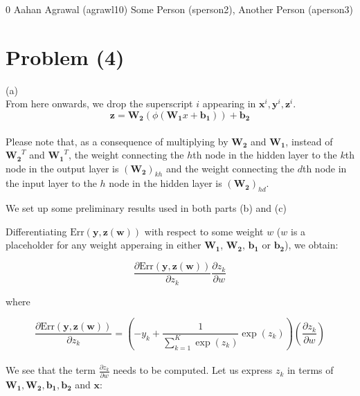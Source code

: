 \documentclass[../main.tex]{subfiles}
\begin{document}
\homework
    {0}
    {Aahan Agrawal (agrawl10)}
    {Some Person (sperson2), Another Person (aperson3)}

\section*{Problem (4)}

(a) \\

From here onwards, we drop the superscript $i$ appearing in $\mathbf{x}^{i}, \mathbf{y}^{i}, \mathbf{z}^{i}$. \\

\[
    \mathbf{z} = \mathbf{W_2}\left( \phi\left( \mathbf{W_1} x + \mathbf{b_1} \right) \right) + \mathbf{b_2}
\] \\

Please note that, as a consequence of multiplying by $\mathbf{W_2}$ and $\mathbf{W_1}$, instead
of $\mathbf{W_2}^T$ and $\mathbf{W_1}^T$, the weight connecting the $h$th node in the hidden layer
to the $k$th node in the output layer is $(\mathbf{W_2})_{kh}$ and the weight connecting
the $d$th node in the input layer to the $h$ node in the hidden layer is $(\mathbf{W_2})_{hd}$. \\

\breathe

We set up some preliminary results used in both parts (b) and (c)


Differentiating $\text{Err}(\mathbf{y},\mathbf{z(w)})$ with respect to some weight $w$ ($w$ is a placeholder for any weight apperaing in either $\mathbf{W_1}$, $\mathbf{W_2}$, $\mathbf{b_1}$ or $\mathbf{b_2}$), we obtain:

\[
    \frac{\partial \text{Err}(\mathbf{y},\mathbf{z(w)})}{\partial z_k} \frac{\partial z_k}{\partial w}
\]

where

\[
    \frac{\partial \text{Err}(\mathbf{y},\mathbf{z(w)})}{\partial z_k} = \left(-y_k +  \frac{1}{\sum_{k=1}^{K}\exp{\left( z_{k} \right)}}  \exp{\left( z_{k} \right)}\right)\left(\frac{\partial z_{k}}{\partial w} \right) \tag{$\alpha$}
\] \\

We see that the term $\frac{\partial z_{k}}{\partial w}$ needs to be computed. Let us express $z_{k}$ in terms of $\mathbf{W_1}, \mathbf{W_2}, \mathbf{b_1}, \mathbf{b_2}$ and $\mathbf{x}$:
\end{document}
